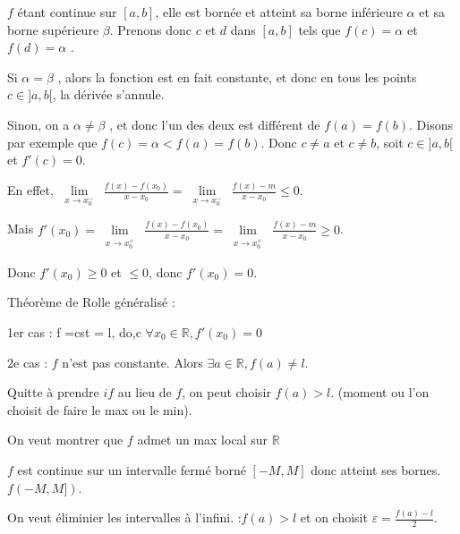\documentclass[french]{yLectureNote}
\newcommand{\Lim}[1]{\lim\limits_{\substack{#1}}\:}
\begin{document}
\begin{myproof}
$f$ étant continue sur $[a, b]$, elle est bornée et atteint
sa borne inférieure $\alpha$ et sa borne supérieure $\beta$. Prenons
donc $c$ et $d$ dans $[a, b]$ tels que $f (c) = \alpha$ et $f (d) = \alpha$ .

Si $\alpha = \beta$ , alors la fonction est en fait constante, et donc en tous les points $c\in ]a, b[$, la dérivée s’annule.

Sinon, on a $\alpha \neq \beta$ , et donc l’un des deux est différent de $f (a) = f (b)$. Disons par exemple
que $f (c) = \alpha < f (a) = f (b)$. Donc $c \neq a$ et $c \neq b$, soit $c \in ]a, b[$ et $f'(c) = 0$.

En effet,
$\Lim{x\to x_0^-} \frac{f(x)-f(x_0)}{x-x_0} = \Lim{x\to x_0^-} \frac{f(x)-m}{x-x_0} \leq 0$.

Mais $f'(x_0) = \Lim{x\to x_0^+} \frac{f(x)-f(x_0)}{x-x_0} = \Lim{x\to x_0^+} \frac{f(x)-m}{x-x_0} \geq 0$.

Donc $f'(x_0) \geq 0 $ et $\leq 0$, donc $f'(x_0) = 0$.


%
%
%
%
%
%
\end{myproof}
Théorème de Rolle généralisé :

1er cas : f =cst = l, do,c $\forall x_0\in\mathbb{R}, f'(x_0) = 0$

2e cas : $f$ n'est pas constante. Alors $\exists a \in\mathbb{R}, f(a)\neq l$.

Quitte à prendre $if$ au lieu de $f$, on peut choisir $f(a)>l$. (moment ou l'on choisit de faire le max ou le min).

On veut montrer que $f$ admet un max local sur $\mathbb{R}$

$f$ est continue sur un intervalle fermé borné $[-M,M]$ donc atteint ses bornes. $f(-M,M])$.

On veut éliminier les intervalles à l'infini. :$f(a)>l$ et on choisit $ \varepsilon = \frac{f(a)-l}{2}$.
\end{document}
